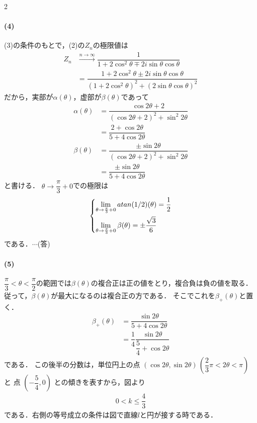 \documentclass[../../main.tex]{subfiles}
\begin{document}
\begin{multicols}{2}
  \paragraph{(4)}
  (3)の条件のもとで，(2)の$Z_n$の極限値は
  \begin{align}
    Z_n
    & \xrightarrow{n \to \infty}
    \dfrac{1}{1+2\cos^2\theta \mp 2i\sin\theta\cos\theta}                                                    \\
    & = \dfrac{1+2\cos^2\theta \pm 2i\sin\theta\cos\theta}{(1+2\cos^2\theta)^2 + (2\sin\theta\cos\theta)^2}
  \end{align}
  だから，実部が$\alpha(\theta)$，虚部が$\beta(\theta)$であって
  \begin{align}
    \alpha(\theta)
    & = \dfrac{\cos2\theta+2}{(\cos2\theta+2)^2 + \sin^2 2\theta}   \\
    & = \dfrac{2+\cos2\theta}{5+4\cos2\theta}                       \\
    \beta(\theta)
    & = \dfrac{\pm \sin2\theta}{(\cos2\theta+2)^2 + \sin^2 2\theta} \\
    & = \dfrac{\pm \sin2\theta}{5+4\cos2\theta}
  \end{align}
  と書ける．
  $\theta\to\dfrac{\pi}{3}+0$での極限は
  \begin{align}
    \begin{dcases}
      \lim_{\theta\to\frac{\pi}{3}+0} \alpha(\theta) =  \dfrac{1}{2} \\
      \lim_{\theta\to\frac{\pi}{3}+0} \beta(\theta)  =   \pm\dfrac{\sqrt{3}}{6}
    \end{dcases}
  \end{align}
  である．$\cdots$(答)

  \paragraph{(5)}
  $\dfrac{\pi}{3} < \theta < \dfrac{\pi}{2}$の範囲では$\beta(\theta)$の複合正は正の値をとり，複合負は負の値を取る．
  従って，$\beta(\theta)$が最大になるのは複合正の方である．
  そこでこれを$\beta_{+}(\theta)$と置く．
  \begin{align}
    \beta_{+}(\theta)
    & = \dfrac{\sin2\theta}{5+4\cos2\theta}                      \\
    & = \dfrac{1}{4} \dfrac{\sin2\theta}{\dfrac{5}{4}+\cos2\theta}
  \end{align}
  である．
  この後半の分数は，単位円上の点 $(\cos 2\theta, \sin 2\theta)\, \left(\dfrac{2}{3}\pi < 2\theta < \pi\right)$
  と 点 $\left(-\dfrac{5}{4}, 0\right)$ との傾きを表すから，図より
  \begin{align}
    0 < k \le \dfrac{4}{3}
  \end{align}
  である．右側の等号成立の条件は図で直線$l$と円が接する時である．


\end{multicols}
\end{document}
